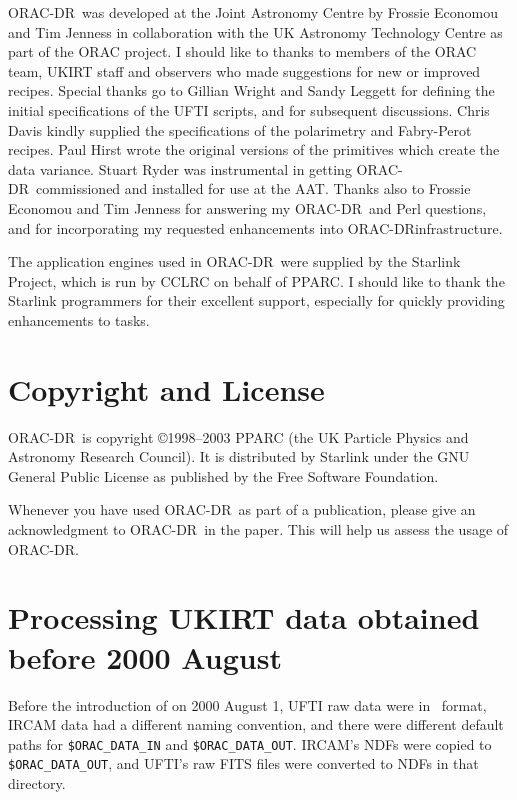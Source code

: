 \documentclass[twoside,11pt,nolof]{starlink}
\providecommand{\ORACDR}{{\footnotesize ORAC-DR}}
\providecommand{\FITSref}{\htmladdnormallink{FITS}{http://fits.gsfc.nasa.gov/}}
\begin{document}
\ORACDR\ was developed at the Joint Astronomy Centre by Frossie
Economou and Tim Jenness in collaboration with the UK Astronomy
Technology Centre as part of the ORAC project.  I should like to
thanks to members of the ORAC team, UKIRT staff and observers who made
suggestions for new or improved recipes.  Special thanks go to Gillian
Wright and Sandy Leggett for defining the initial specifications of
the UFTI scripts, and for subsequent discussions.  Chris Davis kindly
supplied the specifications of the polarimetry and Fabry-Perot
recipes.  Paul Hirst wrote the original versions of the primitives
which create the data variance. Stuart Ryder was instrumental in
getting \ORACDR\ commissioned and installed for use at the AAT.
Thanks also to Frossie Economou and Tim Jenness for answering my
\ORACDR\ and Perl questions, and for incorporating my requested
enhancements into \ORACDR infrastructure.

The application engines used in \ORACDR\ were supplied by the Starlink
Project, which is run by CCLRC on behalf of PPARC.  I should like to
thank the Starlink programmers for their excellent support, especially
for quickly providing enhancements to tasks.

\section{Copyright and License}

\ORACDR\ is copyright \copyright 1998--2003 PPARC (the UK Particle Physics
and Astronomy Research Council).  It is distributed by Starlink
under the GNU General Public License as published by the Free Software
Foundation.

Whenever you have used \ORACDR\ as part of a publication, please give
an acknowledgment to \ORACDR\ in the paper.  This will help us assess
the usage of \ORACDR.

\newpage
\appendix
\section{Processing
UKIRT data obtained before 2000 August\label{
processing_ukirt_data_obtained_before_2000_august}}%

Before the introduction of
on 2000 August 1, UFTI raw data were in \FITSref\ format, IRCAM data had a
different naming convention, and there were different default paths for
{\tt\$ORAC\_DATA\_IN} and {\tt\$ORAC\_DATA\_OUT}.  IRCAM's NDFs were
copied to \texttt{\$ORAC\_DATA\_OUT}, and UFTI's raw FITS files were
converted to NDFs in that directory.
\end{document}
